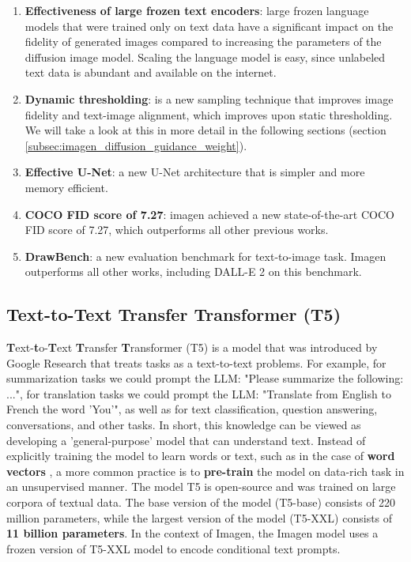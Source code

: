 \begin{enumerate}
    \item \textbf{Effectiveness of large frozen text encoders}: large frozen language models that were trained only on text data have a significant impact on the fidelity of generated images compared to increasing the parameters of the diffusion image model. Scaling the language model is easy, since unlabeled text data is abundant and available on the internet.
    \item \textbf{Dynamic thresholding}: is a new sampling technique that improves image fidelity and text-image alignment, which improves upon static thresholding. We will take a look at this in more detail in the following sections (section \ref{subsec:imagen_diffusion_guidance_weight}).
    \item \textbf{Effective U-Net}: a new U-Net architecture that is simpler and more memory efficient.
    \item \textbf{COCO FID score of 7.27}: imagen achieved a new state-of-the-art COCO FID score of 7.27, which outperforms all other previous works.
    \item \textbf{DrawBench}: a new evaluation benchmark for text-to-image task. Imagen outperforms all other works, including DALL-E 2 \cite{dalle_2} on this benchmark.
\end{enumerate}



















\subsection{Text-to-Text Transfer Transformer (T5)}

\textbf{T}ext-\textbf{t}o-\textbf{T}ext \textbf{T}ransfer \textbf{T}ransformer (T5) \cite{t5_model} is a model that was introduced by Google Research that treats tasks as a text-to-text problems. For example, for summarization tasks we could prompt the LLM: "Please summarize the following: ...", for translation tasks we could prompt the LLM: "Translate from English to French the word 'You'", as well as for text classification, question answering, conversations, and other tasks. In short, this knowledge can be viewed as developing a 'general-purpose' model that can understand text.  Instead of explicitly training the model to learn words or text, such as in the case of \textbf{word vectors} \cite{cbow_word2vec}, a more common practice is to \textbf{pre-train} \cite{bert} the model on data-rich task in an unsupervised manner. The model T5 is open-source and was trained on large corpora of textual data. The base version of the model (T5-base) consists of 220 million parameters, while the largest version of the model (T5-XXL) consists of \textbf{11 billion parameters}. In the context of Imagen, the Imagen model uses a frozen version of T5-XXL model to encode conditional text prompts.

